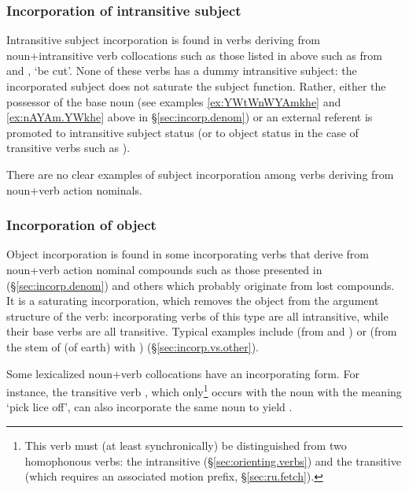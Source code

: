 \subsubsection{Incorporation of intransitive subject} \label{sec:incorp.S}
Intransitive subject incorporation is found in verbs deriving from noun+intransitive verb collocations such as those listed in  above such as  from  and , `be cut'. None of these verbs has a dummy intransitive subject: the incorporated subject does not saturate the subject function. Rather, either the possessor of the base noun (see examples  \ref{ex:YWtWnWYAmkhe} and \ref{ex:nAYAm.YWkhe} above in §\ref{sec:incorp.denom}) or an external referent is promoted to intransitive subject status (or to object status in the case of transitive verbs such as ).

There are no clear examples of subject incorporation among verbs deriving from noun+verb action nominals.

\subsubsection{Incorporation of object} \label{sec:incorp.O}
Object incorporation is found in some incorporating verbs that derive from noun+verb action nominal compounds such as those presented in  (§\ref{sec:incorp.denom}) and others which probably originate from lost compounds. It is a saturating incorporation, which removes the object from the argument structure of the verb: incorporating verbs of this type are all intransitive, while their base verbs are all transitive. Typical examples include   (from  and	) or   (from the stem of  (of earth) with ) (§\ref{sec:incorp.vs.other}).


Some lexicalized noun+verb collocations have an incorporating form. For instance, the transitive verb , which only\footnote{This verb must (at least synchronically) be distinguished from two homophonous verbs: the intransitive  (§\ref{sec:orienting.verbs}) and the transitive  (which requires an associated motion prefix, §\ref{sec:ru.fetch}). } occurs with the noun  with the meaning `pick lice off', can also incorporate the same noun to yield .


